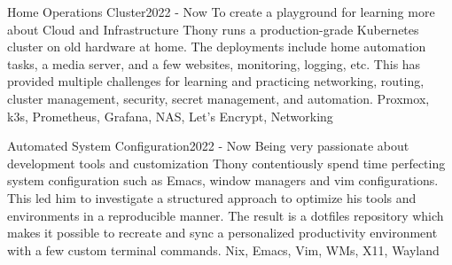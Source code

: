 %
%
%


\begin{projects}

	\project
	{Home Operations Cluster}{2022 - Now}
    {  }
    {
        To create a playground for learning more about Cloud and Infrastructure Thony runs a production-grade Kubernetes cluster on old hardware at home.
        The deployments include home automation tasks, a media server, and a few websites, monitoring, logging, etc. This has provided multiple challenges for learning and practicing networking, routing, cluster management, security, secret management, and automation.
    }
	{Proxmox, k3s, Prometheus, Grafana, NAS, Let's Encrypt, Networking}

    \iffalse
	\project
	{Thony Price Blog/Homepage}{2023 - Now}
	{
        \github{ThonyPrice/blog}
        \website{https://www.thonyprice.com}{https://www.thonyprice.com}
    }
	{
        Homepage to gather information, projects, and stray thoughts.
    }
	{Hugo, Make, Emacs, Netlify, Github Actions}
    \fi

	\project
	{Automated System Configuration}{2022 - Now}
	{}
    {
        Being very passionate about development tools and customization Thony contentiously spend time perfecting system configuration such as Emacs, window managers and vim configurations.
        This led him to investigate a structured approach to optimize his tools and environments in a reproducible manner.
        The result is a dotfiles repository which makes it possible to recreate and sync a personalized productivity environment with a few custom terminal commands.
    }
    {Nix, Emacs, Vim, WMs, X11, Wayland}
 
\end{projects}